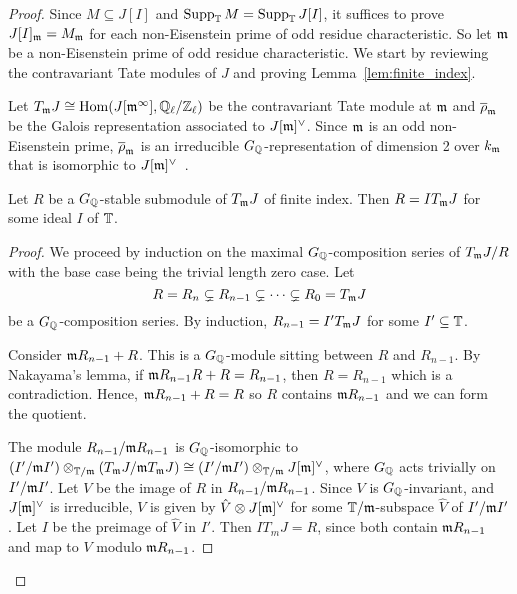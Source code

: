 \documentclass[thesis.tex]{subfiles}
\begin{document}
\begin{proof}
Since $M\subseteq J[I]$ and $\operatorname{Supp}_{\mathbb{T}} M = \operatorname{Supp}_{\mathbb{T}} J[I]$, it suffices to
prove $J[I]_{\mathfrak{m}} = M_{\mathfrak{m}}$ for each non-Eisenstein prime of odd residue
characteristic. So let $\mathfrak{m}$ be a non-Eisenstein prime of odd residue
characteristic. We start by reviewing the contravariant Tate modules of $J$ and
proving Lemma~\ref{lem:finite_index}.

Let $T_{\mathfrak{m}} J\cong \operatorname{Hom}(J[\mathfrak{m}^\infty], \mathbb{Q}_\ell/\mathbb{Z}_\ell)$ be the contravariant
Tate module at $\mathfrak{m}$ and $\overline{\rho}_{\mathfrak{m}}$ be the Galois representation
associated to $J[\mathfrak{m}]^\vee$. Since $\mathfrak{m}$ is an odd non-Eisenstein prime,
$\overline{\rho}_{\mathfrak{m}}$ is an irreducible $G_{\mathbb{Q}}$-representation of dimension 2
over $k_{\mathfrak{m}}$ that is isomorphic to $J[\mathfrak{m}]^\vee$~\cite[Prop.
14.2]{mazur:eisenstein}.

\begin{lemma}\label{lem:finite_index}
    Let $R$ be a $G_{\mathbb{Q}}$-stable submodule of $T_{\mathfrak{m}} J$ of finite index. Then
    $R=IT_{\mathfrak{m}} J$ for some ideal $I$ of $\mathbb{T}$.
\end{lemma}
\begin{proof}
    We proceed by induction on the maximal $G_{\mathbb{Q}}$-composition series of $T_{\mathfrak{m}} J/R$
    with the base case being the trivial length zero case. Let
    \[
        R = R_n \subsetneq R_{n-1} \subsetneq \cdots \subsetneq R_0 = T_{\mathfrak{m}} J
    \]
    be a $G_{\mathbb{Q}}$-composition series. By induction, $R_{n-1} = I'T_{\mathfrak{m}} J$ for some
    $I'\subseteq \mathbb{T}$.

    Consider $\mathfrak{m} R_{n-1} + R$. This is a $G_{\mathbb{Q}}$-module sitting between $R$ and
    $R_{n-1}$. By Nakayama's lemma, if $\mathfrak{m} R_{n-1} R + R = R_{n-1}$, then
    $R=R_{n-1}$ which is a contradiction. Hence, $\mathfrak{m} R_{n-1}+R=R$ so $R$
    contains $\mathfrak{m} R_{n-1}$ and we can form the quotient.

    The module $R_{n-1}/\mathfrak{m} R_{n-1}$ is $G_{\mathbb{Q}}$-isomorphic to $(I'/\mathfrak{m}
    I')\otimes_{\mathbb{T}/\mathfrak{m}} (T_{\mathfrak{m}} J/\mathfrak{m} T_{\mathfrak{m}} J) \cong (I'/\mathfrak{m} I')\otimes_{\mathbb{T}/\mathfrak{m}}
    J[\mathfrak{m}]^\vee$, where $G_{\mathbb{Q}}$ acts trivially on $I'/\mathfrak{m} I'$. Let $V$ be the image
    of $R$ in $R_{n-1}/\mathfrak{m} R_{n-1}$. Since $V$ is $G_{\mathbb{Q}}$-invariant, and
    $J[\mathfrak{m}]^\vee$ is irreducible, $V$ is given by $\hat{V}\otimes J[\mathfrak{m}]^\vee$
    for some $\mathbb{T}/\mathfrak{m}$-subspace $\hat{V}$ of $I'/\mathfrak{m} I'$. Let $I$ be the preimage
    of $\hat{V}$ in $I'$. Then $IT_m J = R$, since both contain $\mathfrak{m} R_{n-1}$
    and map to $V$ modulo $\mathfrak{m} R_{n-1}$.
\end{proof}



\end{proof}
\end{document}
